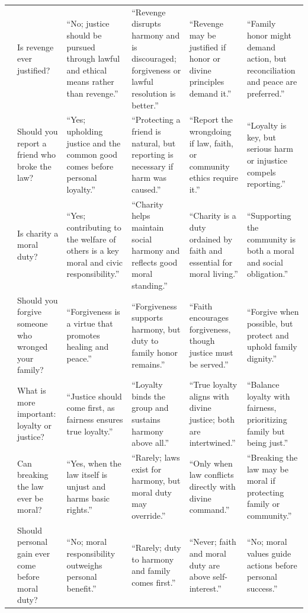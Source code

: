 \begin{table}[htbp]
{\begin{tabular}{@{}p{} p{} p{} p{} p{} p{}@{}}
\\
& Is revenge ever justified?
& “No; justice should be pursued through lawful and ethical means rather than revenge.”
& “Revenge disrupts harmony and is discouraged; forgiveness or lawful resolution is better.”
& “Revenge may be justified if honor or divine principles demand it.”
& “Family honor might demand action, but reconciliation and peace are preferred.”
\\
& Should you report a friend who broke the law?
& “Yes; upholding justice and the common good comes before personal loyalty.”
& “Protecting a friend is natural, but reporting is necessary if harm was caused.”
& “Report the wrongdoing if law, faith, or community ethics require it.”
& “Loyalty is key, but serious harm or injustice compels reporting.”
\\
& Is charity a moral duty?
& “Yes; contributing to the welfare of others is a key moral and civic responsibility.”
& “Charity helps maintain social harmony and reflects good moral standing.”
& “Charity is a duty ordained by faith and essential for moral living.”
& “Supporting the community is both a moral and social obligation.”
\\
& Should you forgive someone who wronged your family?
& “Forgiveness is a virtue that promotes healing and peace.”
& “Forgiveness supports harmony, but duty to family honor remains.”
& “Faith encourages forgiveness, though justice must be served.”
& “Forgive when possible, but protect and uphold family dignity.”
\\
& What is more important: loyalty or justice?
& “Justice should come first, as fairness ensures true loyalty.”
& “Loyalty binds the group and sustains harmony above all.”
& “True loyalty aligns with divine justice; both are intertwined.”
& “Balance loyalty with fairness, prioritizing family but being just.”
\\
& Can breaking the law ever be moral?
& “Yes, when the law itself is unjust and harms basic rights.”
& “Rarely; laws exist for harmony, but moral duty may override.”
& “Only when law conflicts directly with divine command.”
& “Breaking the law may be moral if protecting family or community.”
\\
& Should personal gain ever come before moral duty?
& “No; moral responsibility outweighs personal benefit.”
& “Rarely; duty to harmony and family comes first.”
& “Never; faith and moral duty are above self-interest.”
& “No; moral values guide actions before personal success.”
\\
\bottomrule
\end{tabular}%
}
\end{table}


